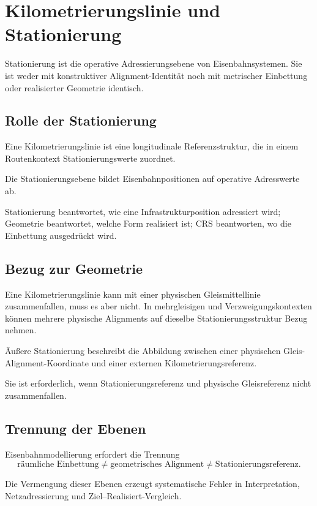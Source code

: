 \chapter{Kilometrierungslinie und Stationierung}
\label{chap:km-line-and-stationing}

Stationierung ist die operative Adressierungsebene von Eisenbahnsystemen. Sie
ist weder mit konstruktiver Alignment-Identität noch mit metrischer Einbettung
oder realisierter Geometrie identisch.

\section{Rolle der Stationierung}
\begin{definition}[Kilometrierungslinie]
Eine Kilometrierungslinie ist eine longitudinale Referenzstruktur, die in
einem Routenkontext Stationierungswerte zuordnet.
\end{definition}
\begin{definition}[Stationierungsebene]
Die Stationierungsebene bildet Eisenbahnpositionen auf operative Adresswerte
ab.
\end{definition}

Stationierung beantwortet, wie eine Infrastrukturposition adressiert wird;
Geometrie beantwortet, welche Form realisiert ist; CRS beantworten, wo die
Einbettung ausgedrückt wird.

\section{Bezug zur Geometrie}
Eine Kilometrierungslinie kann mit einer physischen Gleismittellinie
zusammenfallen, muss es aber nicht. In mehrgleisigen und
Verzweigungskontexten können mehrere physische Alignments auf dieselbe
Stationierungsstruktur Bezug nehmen.

\begin{definition}
Äußere Stationierung beschreibt die Abbildung zwischen einer physischen
Gleis-Alignment-Koordinate und einer externen Kilometrierungsreferenz.
\end{definition}
Sie ist erforderlich, wenn Stationierungsreferenz und physische Gleisreferenz
nicht zusammenfallen.

\section{Trennung der Ebenen}
\begin{proposition}
Eisenbahnmodellierung erfordert die Trennung
\[
\text{räumliche Einbettung}\neq\text{geometrisches Alignment}
\neq\text{Stationierungsreferenz}.
\]
\end{proposition}
Die Vermengung dieser Ebenen erzeugt systematische Fehler in Interpretation,
Netzadressierung und Ziel--Realisiert-Vergleich.

